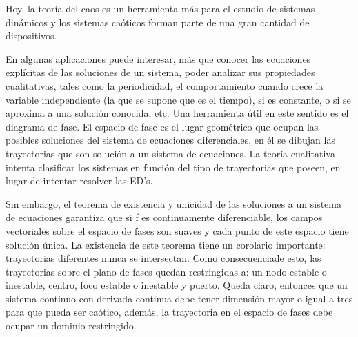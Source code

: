 Hoy, la teoría del caos es un herramienta más para el estudio de sistemas dinámicos y los sistemas caóticos forman parte de una gran cantidad de dispositivos.

En algunas aplicaciones puede interesar, más que conocer las ecuaciones explícitas de las soluciones de un sistema, poder analizar sus propiedades cualitativas, tales como la periodicidad, el comportamiento cuando crece la variable independiente (la que se supone que es el tiempo), si es constante, o si se aproxima a una solución conocida, etc. Una herramienta útil en este sentido es el diagrama de fase. El espacio de fase es el lugar geométrico que ocupan las posibles soluciones del sistema de ecuaciones diferenciales, en él se dibujan las trayectorias que son solución a un sistema de ecuaciones. La teoría cualitativa intenta clasificar los sistemas en función del tipo de trayectorias que poseen, en lugar de intentar resolver las ED’s.

Sin embargo, el teorema de existencia y unicidad de las soluciones a un sistema de ecuaciones garantiza que si f es continuamente diferenciable, los campos vectoriales sobre el espacio de fases son suaves y cada punto de este espacio tiene solución única. La existencia de este teorema tiene un corolario importante: trayectorias diferentes nunca se intersectan. Como consecuenciade esto, las trayectorias sobre el plano de fases quedan restringidas a: un nodo estable o inestable, centro, foco estable o inestable y puerto.
Queda claro, entonces que un sistema continuo con derivada continua debe tener dimensión mayor o igual a tres para que pueda ser caótico, además, la trayectoria en el espacio de fases debe ocupar un dominio restringido.

